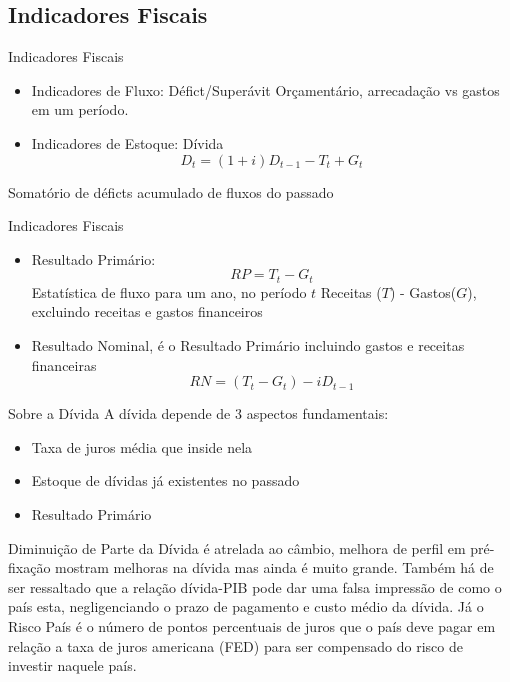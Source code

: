 \documentclass[xcolor=dvipsnames]{beamer}
\begin{document}
\subsection{Indicadores Fiscais}
\begin{frame}{Indicadores Fiscais}
\begin{itemize}
    \item Indicadores de Fluxo: Défict/Superávit Orçamentário, arrecadação vs gastos em um período. 
    \item Indicadores de Estoque: Dívida 
    \begin{equation}
        D_{t} = (1+i)D_{t-1} - T_{t} + G_{t}
    \end{equation}
\end{itemize}
Somatório de déficts acumulado de fluxos do passado
\end{frame}
\begin{frame}{Indicadores Fiscais}
\begin{itemize}
     \item Resultado Primário:
    \begin{equation}
        RP = T_{t} - G_{t}
    \end{equation}
    Estatística de fluxo para um ano, no período $t$
    Receitas ($T$) - Gastos($G$), excluindo receitas e gastos financeiros 
    \item Resultado Nominal, é o Resultado Primário incluindo gastos e receitas financeiras
    \begin{equation}
        RN = (T_{t} - G_{t}) - iD_{t-1}
    \end{equation}
\end{itemize}
\end{frame}
\begin{frame}{Sobre a Dívida}
A dívida depende de 3 aspectos fundamentais:
\begin{itemize}
    \item Taxa de juros média que inside nela 
    \item Estoque de dívidas já existentes no passado
    \item Resultado Primário 
\end{itemize}
Diminuição de Parte da Dívida é atrelada ao câmbio, melhora de perfil em pré-fixação mostram melhoras na dívida mas ainda é muito grande. Também há de ser ressaltado que a relação dívida-PIB pode dar uma falsa impressão de como o país esta, negligenciando o prazo de pagamento e custo médio da dívida. 
Já o Risco País é o número de pontos percentuais de juros que o país deve pagar em relação a taxa de juros americana (FED) para ser compensado do risco de investir naquele país. 
\end{frame}
\end{document}
